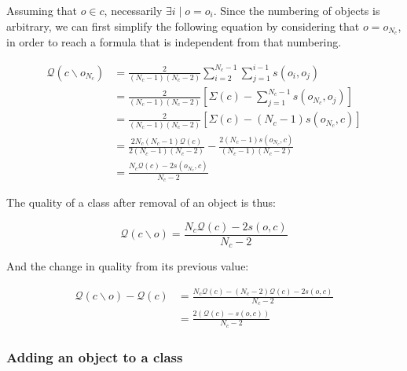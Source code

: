 \documentclass[10pt,journal,compsoc]{IEEEtran}
\begin{document}
Assuming that $o \in c$, necessarily $\exists i \mid o=o_i$. Since the numbering of objects is arbitrary, we can first simplify the following equation by considering that $o = o_{N_c}$, in order to reach a formula that is independent from that numbering.

\begin{equation}
  \begin{aligned}
    \mathcal{Q}\left(c \smallsetminus o_{N_c}\right) & = \frac{2}{(N_c-1)(N_c-2)} \sum_{i=2}^{N_c-1} \sum_{j=1}^{i-1} s\left(o_i, o_j\right) \\
                                                   & = \frac{2}{(N_c-1)(N_c-2)} \left[\Sigma(c) - \sum_{j=1}^{N_c-1} s\left(o_{N_c}, o_j\right) \right] \\
                                                   & = \frac{2}{(N_c-1)(N_c-2)} \left[\Sigma(c) - (N_c-1)s\left(o_{N_c}, c\right) \right] \\
                                                   & = \frac{2N_c(N_c-1)\mathcal{Q}(c)}{2(N_c-1)(N_c-2)} - \frac{2(N_c-1)s\left(o_{N_c}, c\right)}{(N_c-1)(N_c-2)}\\
                                                   & = \frac{N_c \mathcal{Q}(c)  - 2s\left(o_{N_c}, c\right)}{N_c-2}
  \end{aligned}
\end{equation}

The quality of a class after removal of an object is thus:

\begin{equation}
  \mathcal{Q}\left(c \smallsetminus o\right) = \frac{N_c \mathcal{Q}(c)  - 2s\left(o, c\right)}{N_c-2}
  \label{eq:newQual_remove}
\end{equation}

And the change in quality from its previous value:

\begin{equation} \label{deltaRemove}
  \begin{aligned}
    \mathcal{Q}\left(c \smallsetminus o\right) - \mathcal{Q}\left(c\right) & = \frac{N_c \mathcal{Q}(c)  - (N_c-2) \mathcal{Q}(c)  - 2s\left(o, c\right)}{N_c-2} \\
                                                                           & = \frac{2\left( \mathcal{Q}(c) - s\left(o, c\right)\right)}{N_c-2}
    \end{aligned}
\end{equation}


\subsubsection{Adding an object to a class}
\end{document}
